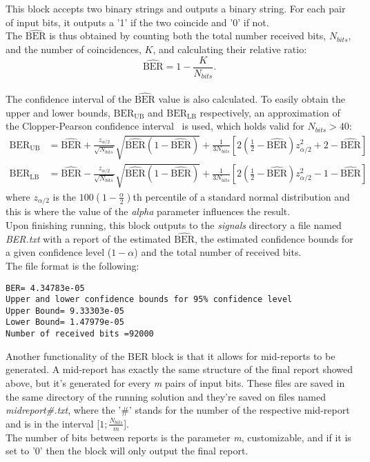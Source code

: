 \begin{refsection}
This block accepts two binary strings and outputs a binary string. For each pair of input bits, it outputs a '1' if the two coincide and '0' if not.
\\
The $\widehat{\text{BER}}$ is thus obtained by counting both the total number received bits, $N_{bits}$, and the number of coincidences, $K$, and calculating their relative ratio:
\begin{equation}
\widehat{\text{BER}}=1-\frac{K}{N_{bits}}.
\end{equation}
\\
The confidence interval of the $\widehat{\text{BER}}$ value is also calculated. To easily obtain the upper and lower bounds, $\text{BER}_\text{UB}$ and $\text{BER}_\text{LB}$ respectively, an approximation of the Clopper-Pearson confidence interval~\cite{Almeida16} is used, which holds valid for $N_{bits}>40$:
\begin{align}
\text{BER}_\text{UB}&=\widehat{\text{BER}}+\frac{z_{\alpha/2}}{\sqrt{N_{bits}}}\sqrt{\widehat{\text{BER}}(1-\widehat{\text{BER}})}+\frac{1}{3N_{bits}}\left[2\left(\frac{1}{2}-\widehat{\text{BER}}\right)z_{\alpha/2}^2+2-\widehat{\text{BER}}\right]\\
\text{BER}_\text{LB}&=\widehat{\text{BER}}-\frac{z_{\alpha/2}}{\sqrt{N_{bits}}}\sqrt{\widehat{\text{BER}}(1-\widehat{\text{BER}})}+\frac{1}{3N_{bits}}\left[2\left(\frac{1}{2}-\widehat{\text{BER}}\right)z_{\alpha/2}^2-1-\widehat{\text{BER}}\right]
\end{align}
where $z_{\alpha/2}$ is the $100\left(1-\frac{\alpha}{2}\right)$th percentile of a standard normal distribution and this is where the value of the \textit{alpha} parameter influences the result.
\\
Upon finishing running, this block outputs to the \textit{signals} directory a file named \textit{BER.txt} with a report of the estimated $\widehat{\text{BER}}$, the estimated confidence bounds for a given confidence level ($1-\alpha$) and the total number of received bits.
\\
The file format is the following:
\begin{adjustwidth}{1.5cm}{}
\begin{verbatim}
BER= 4.34783e-05
Upper and lower confidence bounds for 95% confidence level
Upper Bound= 9.33303e-05
Lower Bound= 1.47979e-05
Number of received bits =92000
\end{verbatim}
\end{adjustwidth}
Another functionality of the BER block is that it allows for mid-reports to be generated. A mid-report has exactly the same structure of the final report showed above, but it's generated for every \textit{m} pairs of input bits. These files are saved in the same directory of the running solution and they're saved on files named \textit{midreport\#.txt}, where the '\#' stands for the number of the respective mid-report and is in the interval [$1;\frac{N_{bits}}{m}$].
\\
The number of bits between reports is the parameter \textit{m}, customizable, and if it is set to '0' then the block will only output the final report.


\end{refsection}

